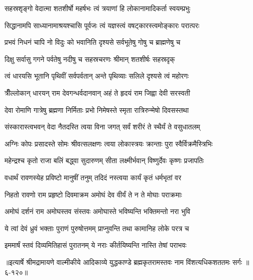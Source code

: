 \twolineshloka
{सहस्रशृङ्गो वेदात्मा शतशीर्षो महर्षभः}
{त्वं त्रयाणां हि लोकानामादिकर्ता स्वयम्प्रभुः} %

\twolineshloka
{सिद्धानामपि साध्यानामाश्रयश्चासि पूर्वजः}
{त्वं यज्ञस्त्वं वषट्कारस्त्वमोङ्कारः परात्परः} %

\twolineshloka
{प्रभवं निधनं चापि नो विदुः को भवानिति}
{दृश्यसे सर्वभूतेषु गोषु च ब्राह्मणेषु च} %

\twolineshloka
{दिक्षु सर्वासु गगने पर्वतेषु नदीषु च}
{सहस्रचरणः श्रीमान् शतशीर्षः सहस्रदृक्} %

\twolineshloka
{त्वं धारयसि भूतानि पृथिवीं सर्वपर्वतान्}
{अन्ते पृथिव्याः सलिले दृश्यसे त्वं महोरगः} %

\twolineshloka
{त्रीँल्लोकान् धारयन् राम देवगन्धर्वदानवान्}
{अहं ते हृदयं राम जिह्वा देवी सरस्वती} %

\twolineshloka
{देवा रोमाणि गात्रेषु ब्रह्मणा निर्मिताः प्रभो}
{निमेषस्ते स्मृता रात्रिरुन्मेषो दिवसस्तथा} %

\twolineshloka
{संस्कारास्त्वभवन् वेदा नैतदस्ति त्वया विना}
{जगत् सर्वं शरीरं ते स्थैर्यं ते वसुधातलम्} %

\twolineshloka
{अग्निः कोपः प्रसादस्ते सोमः श्रीवत्सलक्षणः}
{त्वया लोकास्त्रयः क्रान्ताः पुरा स्वैर्विक्रमैस्त्रिभिः} %

\twolineshloka
{महेन्द्रश्च कृतो राजा बलिं बद्ध्वा सुदारुणम्}
{सीता लक्ष्मीर्भवान् विष्णुर्देवः कृष्णः प्रजापतिः} %

\twolineshloka
{वधार्थं रावणस्येह प्रविष्टो मानुषीं तनुम्}
{तदिदं नस्त्वया कार्यं कृतं धर्मभृतां वर} %

\twolineshloka
{निहतो रावणो राम प्रहृष्टो दिवमाक्रम}
{अमोघं देव वीर्यं ते न ते मोघाः पराक्रमाः} %

\twolineshloka
{अमोघं दर्शनं राम अमोघस्तव संस्तवः}
{अमोघास्ते भविष्यन्ति भक्तिमन्तो नरा भुवि} %

\twolineshloka
{ये त्वां देवं ध्रुवं भक्ताः पुराणं पुरुषोत्तमम्}
{प्राप्नुवन्ति तथा कामानिह लोके परत्र च} %

\twolineshloka
{इममार्षं स्तवं दिव्यमितिहासं पुरातनम्}
{ये नराः कीर्तयिष्यन्ति नास्ति तेषां पराभवः} %


॥इत्यार्षे श्रीमद्रामायणे वाल्मीकीये आदिकाव्ये युद्धकाण्डे ब्रह्मकृतरामस्तवः नाम विंशत्यधिकशततमः सर्गः ॥६-१२०॥
